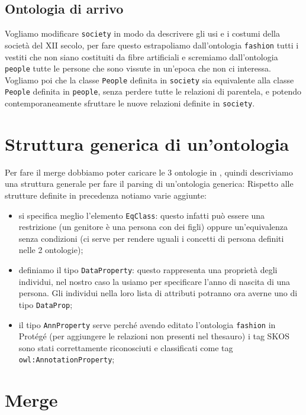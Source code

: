 \subsection{Ontologia di arrivo}
Vogliamo modificare \verb|society| in modo da descrivere gli usi e i costumi della società del XII secolo, per fare questo estrapoliamo dall'ontologia \verb|fashion| tutti i vestiti che non siano costituiti da fibre artificiali e scremiamo dall'ontologia \verb|people| tutte le persone che sono vissute in un'epoca che non ci interessa. Vogliamo poi che la classe \verb|People| definita in \verb|society| sia equivalente alla classe \verb|People| definita in \verb|people|, senza perdere tutte le relazioni di parentela, e potendo contemporaneamente sfruttare le nuove relazioni definite in \verb|society|.

\section{Struttura generica di un'ontologia}
Per fare il merge dobbiamo poter caricare le 3 ontologie in \cduce, quindi descriviamo una struttura generale per fare il parsing di un'ontologia generica:
\newpage
Rispetto alle strutture definite in precedenza notiamo varie aggiunte:
\begin{itemize}
	\item si specifica meglio l'elemento \verb|EqClass|: questo infatti può essere una restrizione (un genitore è una persona con dei figli) oppure un'equivalenza senza condizioni (ci serve per rendere uguali i concetti di persona definiti nelle 2 ontologie);
	\item definiamo il tipo \verb|DataProperty|: questo rappresenta una proprietà degli individui, nel nostro caso la usiamo per specificare l'anno di nascita di una persona. Gli individui nella loro lista di attributi potranno ora averne uno di tipo \verb|DataProp|;
	\item il tipo \verb|AnnProperty| serve perché avendo editato l'ontologia \verb|fashion| in Protégé (per aggiungere le relazioni non presenti nel thesauro) i tag SKOS sono stati correttamente riconosciuti \cite{OWL&SKOS} e classificati come tag \verb|owl:AnnotationProperty|;
\end{itemize}
\section{Merge}
